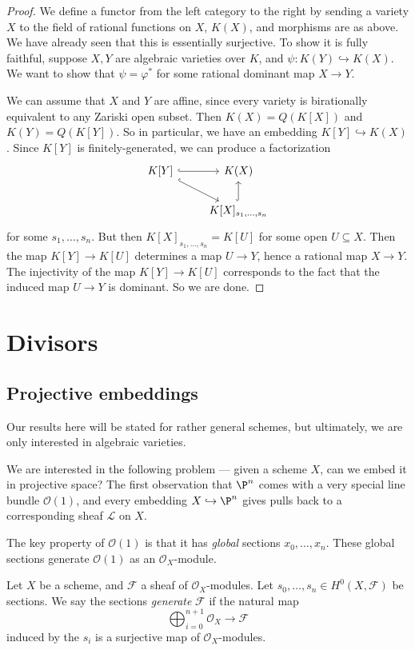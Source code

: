 \documentclass[a4paper]{article}
\begin{document}
\begin{proof}
  We define a functor from the left category to the right by sending a variety $X$ to the field of rational functions on $X$, $K(X)$, and morphisms are as above. We have already seen that this is essentially surjective. To show it is fully faithful, suppose $X, Y$ are algebraic varieties over $K$, and $\psi: K(Y) \hookrightarrow K(X)$. We want to show that $\psi = \varphi^*$ for some rational dominant map $X \to Y$.

  We can assume that $X$ and $Y$ are affine, since every variety is birationally equivalent to any Zariski open subset. Then $K(X) = Q(K[X])$ and $K(Y) = Q(K[Y])$. So in particular, we have an embedding $K[Y] \hookrightarrow K(X)$. Since $K[Y]$ is finitely-generated, we can produce a factorization
  \[
    \begin{tikzcd}
      K[Y] \ar[r, hook] \ar[dr, hook] & K(X) \\
      & K[X]_{s_1, \ldots, s_n} \ar[u, hook]
    \end{tikzcd}
  \]
  for some $s_1, \ldots, s_n$. But then $K[X]_{s_1, \ldots, s_n} = K[U]$ for some open $U \subseteq X$. Then the map $K[Y] \to K[U]$ determines a map $U \to Y$, hence a rational map $X \to Y$. The injectivity of the map $K[Y] \to K[U]$ corresponds to the fact that the induced map $U \to Y$ is dominant. So we are done.
\end{proof}

\section{Divisors}
\subsection{Projective embeddings}
Our results here will be stated for rather general schemes, but ultimately, we are only interested in algebraic varieties.

We are interested in the following problem --- given a scheme $X$, can we embed it in projective space? The first observation that $\P^n$ comes with a very special line bundle $\mathcal{O}(1)$, and every embedding $X \hookrightarrow \P^n$ gives pulls back to a corresponding sheaf $\mathcal{L}$ on $X$.

The key property of $\mathcal{O}(1)$ is that it has \emph{global} sections $x_0, \ldots, x_n$. These global sections generate $\mathcal{O}(1)$ as an $\mathcal{O}_X$-module.

\begin{defi}
  Let $X$ be a scheme, and $\mathcal{F}$ a sheaf of $\mathcal{O}_X$-modules. Let $s_0, \ldots, s_n \in H^0(X, \mathcal{F})$ be sections. We say the sections \emph{generate} $\mathcal{F}$ if the natural map
  \[
    \bigoplus_{i = 0}^{n + 1} \mathcal{O}_X \to \mathcal{F}
  \]
  induced by the $s_i$ is a surjective map of $\mathcal{O}_X$-modules.
\end{defi}
\end{document}
